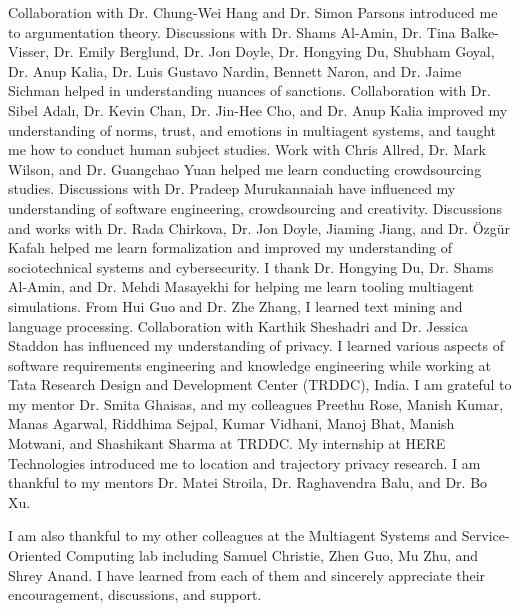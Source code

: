 \begin{acknowledgements}
%
Collaboration with Dr. Chung-Wei Hang and Dr. Simon Parsons introduced me to argumentation theory. 
Discussions with Dr. Shams Al-Amin, Dr. Tina Balke-Visser, Dr. Emily Berglund, Dr. Jon Doyle, Dr. Hongying Du, Shubham Goyal, Dr. Anup Kalia, Dr. Luis Gustavo Nardin, Bennett Naron, and Dr. Jaime Sichman helped in understanding nuances of sanctions. 
Collaboration with Dr. Sibel Adal{\i}, Dr. Kevin Chan, Dr. Jin-Hee Cho, and Dr. Anup Kalia improved my understanding of norms, trust, and emotions in multiagent systems, and taught me how to conduct human subject studies. Work with Chris Allred, Dr. Mark Wilson, and Dr. Guangchao Yuan helped me learn conducting crowdsourcing studies. 
Discussions with Dr. Pradeep Murukannaiah have influenced my understanding of software engineering, crowdsourcing and creativity.
Discussions and works with Dr. Rada Chirkova, Dr. Jon Doyle, Jiaming Jiang, and Dr. {\"O}zg{\"u}r Kafal{\i} helped me learn formalization and improved my understanding of sociotechnical systems and cybersecurity. I thank Dr. Hongying Du, Dr. Shams Al-Amin, and Dr. Mehdi Masayekhi for helping me learn tooling multiagent simulations. 
From Hui Guo and Dr. Zhe Zhang, I learned text mining and language processing. 
Collaboration with Karthik Sheshadri and Dr. Jessica Staddon has influenced my understanding of privacy. 
I learned various aspects of software requirements engineering and knowledge engineering while working at Tata Research Design and Development Center (TRDDC), India. I am grateful to my mentor Dr. Smita Ghaisas, and my colleagues Preethu Rose, Manish Kumar, Manas Agarwal, Riddhima Sejpal, Kumar Vidhani, Manoj Bhat, Manish Motwani, and Shashikant Sharma at TRDDC.
My internship at HERE Technologies introduced me to location and trajectory privacy research. I am thankful to my mentors Dr. Matei Stroila, Dr. Raghavendra Balu, and Dr. Bo Xu. 

I am also thankful to my other colleagues at the Multiagent Systems and Service-Oriented Computing lab including Samuel Christie, Zhen Guo, Mu Zhu, and Shrey Anand. I have learned from each of them and sincerely appreciate their encouragement, discussions, and support. 


\end{acknowledgements}
